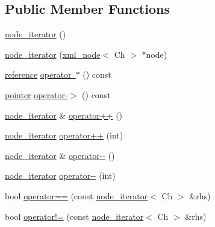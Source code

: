 \subsection*{Public Member Functions}
\begin{DoxyCompactItemize}
\item 
\mbox{\hyperlink{classrapidxml_1_1node__iterator_a4e1244b9e9e1d2b5129235806d1e31ad}{node\+\_\+iterator}} ()
\item 
\mbox{\hyperlink{classrapidxml_1_1node__iterator_a94c3da59b54e4bd003e226cc35b3c266}{node\+\_\+iterator}} (\mbox{\hyperlink{classrapidxml_1_1xml__node}{xml\+\_\+node}}$<$ Ch $>$ $\ast$node)
\item 
\mbox{\hyperlink{classrapidxml_1_1node__iterator_ad7fabbcb7d3d9e4e220299c5475b9e9c}{reference}} \mbox{\hyperlink{classrapidxml_1_1node__iterator_ad0e779ea201861330ab1360f1a75cb7b}{operator $\ast$}} () const
\item 
\mbox{\hyperlink{classrapidxml_1_1node__iterator_a65dca8bca2b9c29f635b9ad0bdeeecb9}{pointer}} \mbox{\hyperlink{classrapidxml_1_1node__iterator_a203f946893733b2f8526b49c3c9039ef}{operator-\/$>$}} () const
\item 
\mbox{\hyperlink{classrapidxml_1_1node__iterator}{node\+\_\+iterator}} \& \mbox{\hyperlink{classrapidxml_1_1node__iterator_a8d6b184a76b2ec8a8b5e90bc013c80ed}{operator++}} ()
\item 
\mbox{\hyperlink{classrapidxml_1_1node__iterator}{node\+\_\+iterator}} \mbox{\hyperlink{classrapidxml_1_1node__iterator_ad01b4e43e348a330984833fd4924d0f2}{operator++}} (int)
\item 
\mbox{\hyperlink{classrapidxml_1_1node__iterator}{node\+\_\+iterator}} \& \mbox{\hyperlink{classrapidxml_1_1node__iterator_ace52107ecd1bcf02e49619e86206e3a3}{operator-\/-\/}} ()
\item 
\mbox{\hyperlink{classrapidxml_1_1node__iterator}{node\+\_\+iterator}} \mbox{\hyperlink{classrapidxml_1_1node__iterator_a4ca35716bb7865f199a137b063af6080}{operator-\/-\/}} (int)
\item 
bool \mbox{\hyperlink{classrapidxml_1_1node__iterator_a5cb8a3b0d65a1a2517995e986a4debfd}{operator==}} (const \mbox{\hyperlink{classrapidxml_1_1node__iterator}{node\+\_\+iterator}}$<$ Ch $>$ \&rhs)
\item 
bool \mbox{\hyperlink{classrapidxml_1_1node__iterator_a20f1e25347d7e3856694f18597f7c8e2}{operator!=}} (const \mbox{\hyperlink{classrapidxml_1_1node__iterator}{node\+\_\+iterator}}$<$ Ch $>$ \&rhs)
\end{DoxyCompactItemize}

